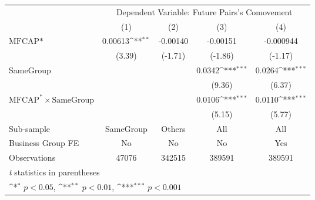 {
\def\sym#1{\ifmmode^{#1}\else\(^{#1}\)\fi}
\begin{tabular}{l*{4}{c}}
\hline\hline
                &\multicolumn{4}{c}{Dependent Variable:  Future Pairs's Comovement}         \\\cmidrule(lr){2-5}
                &\multicolumn{1}{c}{(1)}         &\multicolumn{1}{c}{(2)}         &\multicolumn{1}{c}{(3)}         &\multicolumn{1}{c}{(4)}         \\
\hline
$ \text{MFCAP*} $&  0.00613\sym{**} & -0.00140         & -0.00151         &-0.000944         \\
                &   (3.39)         &  (-1.71)         &  (-1.86)         &  (-1.17)         \\
[1em]
SameGroup       &                  &                  &   0.0342\sym{***}&   0.0264\sym{***}\\
                &                  &                  &   (9.36)         &   (6.37)         \\
[1em]
 $ \text{MFCAP}^* \times {\text{SameGroup} }  $ &                  &                  &   0.0106\sym{***}&   0.0110\sym{***}\\
                &                  &                  &   (5.15)         &   (5.77)         \\
\hline
Sub-sample      &SameGroup         &   Others         &      All         &      All         \\
Business Group FE&       No         &       No         &       No         &      Yes         \\
Observations    &    47076         &   342515         &   389591         &   389591         \\
\hline\hline
\multicolumn{5}{l}{\footnotesize \textit{t} statistics in parentheses}\\
\multicolumn{5}{l}{\footnotesize \sym{*} \(p<0.05\), \sym{**} \(p<0.01\), \sym{***} \(p<0.001\)}\\
\end{tabular}
}
